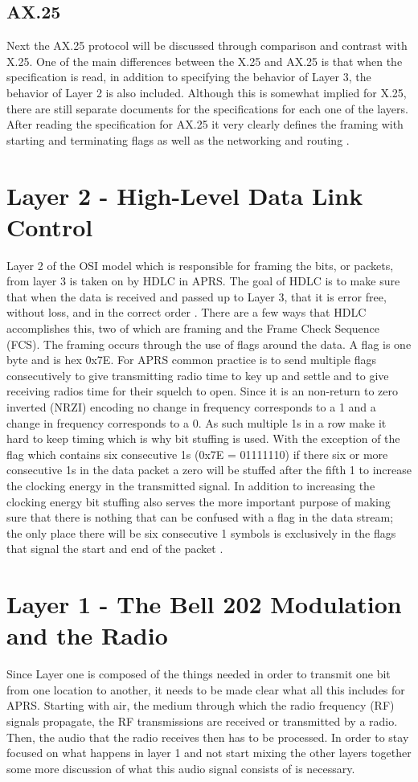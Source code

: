 \subsection{AX.25}
Next the AX.25 protocol will be discussed through comparison and contrast with X.25. One of the main differences between the X.25 and AX.25 is that when the specification is read, in addition to specifying the behavior of Layer 3, the behavior of Layer 2 is also included. Although this is somewhat implied for X.25, there are still separate documents for the specifications for each one of the layers. After reading the specification for AX.25 it very clearly defines the framing with starting and terminating flags as well as the networking and routing \cite{Beech1998}.

\section{Layer 2 - High-Level Data Link Control}
Layer 2 of the OSI model which is responsible for framing the bits, or packets, from layer 3 is taken on by HDLC in APRS. The goal of HDLC is to make sure that when the data is received and passed up to Layer 3, that it is error free, without loss, and in the correct order \cite{Javvin2006}. There are a few ways that HDLC accomplishes this, two of which are framing and the Frame Check Sequence (FCS). The framing occurs through the use of flags around the data. A flag is one byte and is hex 0x7E. For APRS common practice is to send multiple flags consecutively to give transmitting radio time to key up and settle and to give receiving radios time for their squelch to open. Since it is an non-return to zero inverted (NRZI) encoding no change in frequency corresponds to a 1 and a change in frequency corresponds to a 0. As such multiple 1s in a row make it hard to keep timing which is why bit stuffing is used. With the exception of the flag which contains six consecutive 1s (0x7E = 01111110) if there six or more consecutive 1s in the data packet a zero will be stuffed after the fifth 1 to increase the clocking energy in the transmitted signal. In addition to increasing the clocking energy bit stuffing also serves the more important purpose of making sure that there is nothing that can be confused with a flag in the data stream; the only place there will be six consecutive 1 symbols is exclusively in the flags that signal the start and end of the packet \cite{Horzepa1992}.

\section{Layer 1 - The Bell 202 Modulation and the Radio}
Since Layer one is composed of the things needed in order to transmit one bit from one location to another, it needs to be made clear what all this includes for APRS. Starting with air, the medium through which the radio frequency (RF) signals propagate, the RF transmissions are received or transmitted by a radio. Then, the audio that the radio receives then has to be processed. In order to stay focused on what happens in layer 1 and not start mixing the other layers together some more discussion of what this audio signal consists of is necessary.

